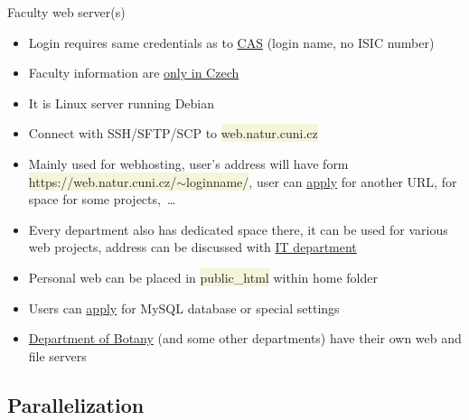 \documentclass[compress, xelatex, 11pt, xcolor=svgnames, aspectratio=169, url={hyphens, lowtilde}]{beamer}
\renewcommand{\texttt}[1]{\colorbox{Beige}{{\ttfamily #1}}}
\begin{document}
\begin{frame}{Faculty web server(s)}
	\begin{itemize}
		\item Login requires same credentials as to \href{https://ldapuser.cuni.cz/}{CAS} (login name, no ISIC number)
		\item Faculty information are \href{https://natur.cuni.cz/fakulta/organizacni-struktura/pracoviste-dekanatu/odbor-informacnich-technologii/sluzby-it/sprava-webu-a-webovych-aplikaci/centralni-webovy-server-prf-uk-web-natur-cuni-cz}{only in Czech}
		\item It is Linux server running Debian
		\item Connect with SSH/SFTP/SCP to \texttt{web.natur.cuni.cz}
		\item Mainly used for webhosting, user's address will have form \texttt{https://web.natur.cuni.cz/$\sim$loginname/}, user can \href{https://helpdesk.natur.cuni.cz/servlet/HelpdeskDynamic?eid=Rozcestnik}{apply} for another URL, for space for some projects,~\ldots
		\item Every department also has dedicated space there, it can be used for various web projects, address can be discussed with \href{https://natur.cuni.cz/en/faculty/organizational-structure/dean-s-office-departments/information-technology-division/contacts}{IT department}
		\item Personal web can be placed in \texttt{public\_html} within home folder
		\item Users can \href{https://helpdesk.natur.cuni.cz/servlet/HelpdeskDynamic?eid=Rozcestnik}{apply} for MySQL database or special settings
		\item \href{https://natur.cuni.cz/en/biology/departments-and-work-places/department-of-botany/working-information/servers-webs-and-computers/departmental-server}{Department of Botany} (and some other departments) have their own web and file servers
	\end{itemize}
\end{frame}

\subsection{Parallelization}
\end{document}
